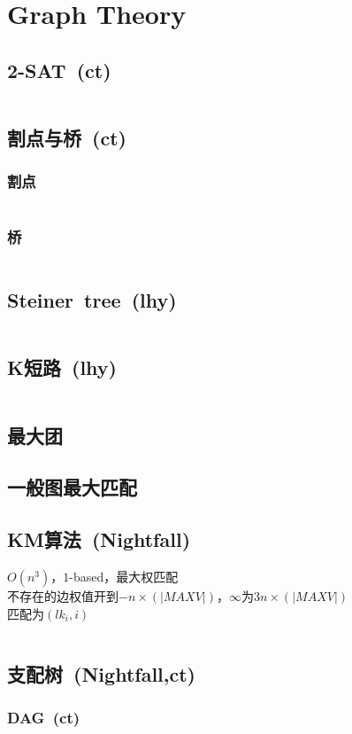 \chapter{Graph Theory}
\section{2-SAT\ \small(ct)}
	\inputminted{cpp}{GraphTheory/2_sat.cpp}
\section{割点与桥\ \small(ct)}
	\subsection*{割点}
		\inputminted{cpp}{GraphTheory/cut_point.cpp}
	\subsection*{桥}
		\inputminted{cpp}{GraphTheory/bridge.cpp}
\section{Steiner\ tree\ \small(lhy)}
	\inputminted{cpp}{GraphTheory/steiner_tree.cpp}
\section{K短路\ \small(lhy)}
	\inputminted{cpp}{GraphTheory/kth_minimum_path.cpp}
\section{最大团}
\section{一般图最大匹配}
\section{KM算法\ \small(Nightfall)}
	$ O(n^3) $，$ 1 $-based，最大权匹配
	\\不存在的边权值开到$ -n \times (\left| MAXV \right|) $，$ \infty $为$ 3 n \times (\left| MAXV \right|) $
	\\匹配为$ (lk_i, i) $
	\inputminted{cpp}{GraphTheory/km.cpp}
\section{支配树\ \small(Nightfall,ct)}
	\subsection*{DAG\ \small(ct)}
		\inputminted{cpp}{GraphTheory/dominator_tree_dag.cpp}
